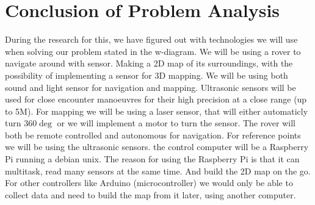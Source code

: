 \section{Conclusion of Problem Analysis}

During the research for this, we have figured out with technologies we will use when solving our problem stated in the w-diagram.
We will be using a rover to navigate around with sensor. Making a 2D map of its surroundings, with the possibility of implementing a sensor for 3D mapping. We will be using both sound and light sensor for navigation and mapping. Ultrasonic sensors will be used for close encounter manoeuvres for their high precision at a close range (up to 5M). For mapping we will be using a laser sensor, that will either automaticly turn 360$\deg$ or we will implement a motor to turn the sensor.
The rover will both be remote controlled and autonomous for navigation. For reference points we will be using the ultrasonic sensors. the control computer will be a Raspberry Pi running a debian unix. The reason for using the Raspberry Pi is that it can multitask, read many sensors at the same time. And build the 2D map on the go. For other controllers like Arduino (microcontroller) we would only be able to collect data and need to build the map from it later, using another computer.  



\clearpage
